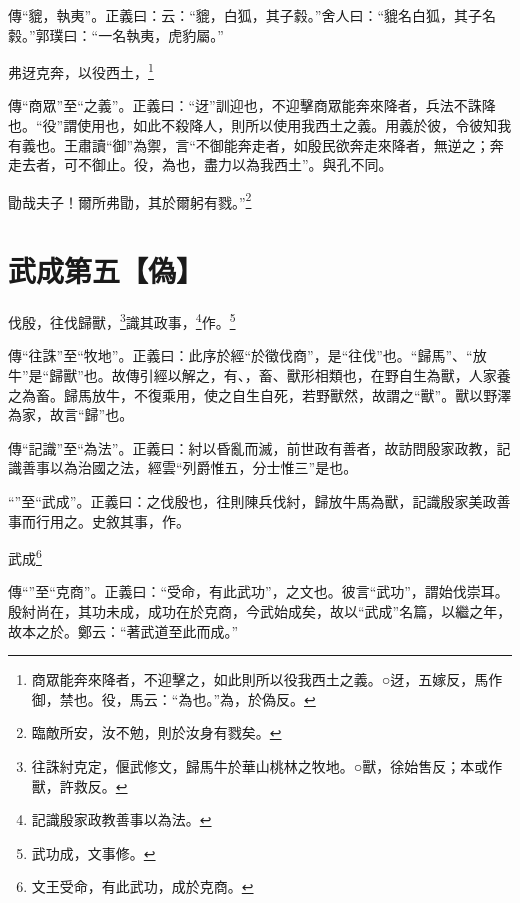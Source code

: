 {\noindent\zhuan{}\fzbyks 傳“貔，執夷”。正義曰：云：“貔，白狐，其子豰。”舍人曰：“貔名白狐，其子名豰。”郭璞曰：“一名執夷，虎豹屬。” \par}

弗迓克奔，以役西土，\footnote{商眾能奔來降者，不迎擊之，如此則所以役我西土之義。○迓，五嫁反，馬作御，禁也。役，馬云：“為也。”為，於偽反。}

{\noindent\zhuan{}\fzbyks 傳“商眾”至“之義”。正義曰：“迓”訓迎也，不迎擊商眾能奔來降者，兵法不誅降也。“役”謂使用也，如此不殺降人，則所以使用我西土之義。用義於彼，令彼知我有義也。王肅讀“御”為禦，言“不御能奔走者，如殷民欲奔走來降者，無逆之；奔走去者，可不御止。役，為也，盡力以為我西土”。與孔不同。 \par}

勖哉夫子！爾所弗勖，其於爾躬有戮。”\footnote{臨敵所安，汝不勉，則於汝身有戮矣。}

\section{武成第五【偽】}


伐殷，往伐歸獸，\footnote{往誅紂克定，偃武修文，歸馬牛於華山桃林之牧地。○獸，徐始售反；本或作獸，許救反。}識其政事，\footnote{記識殷家政教善事以為法。}作。\footnote{武功成，文事修。}


{\noindent\zhuan{}\fzbyks 傳“往誅”至“牧地”。正義曰：此序於經“於徵伐商”，是“往伐”也。“歸馬”、“放牛”是“歸獸”也。故傳引經以解之，有、，畜、獸形相類也，在野自生為獸，人家養之為畜。歸馬放牛，不復乘用，使之自生自死，若野獸然，故謂之“獸”。獸以野澤為家，故言“歸”也。 \par}

{\noindent\zhuan{}\fzbyks 傳“記識”至“為法”。正義曰：紂以昏亂而滅，前世政有善者，故訪問殷家政教，記識善事以為治國之法，經雲“列爵惟五，分士惟三”是也。 \par}

{\noindent\shu{}\fzkt “”至“武成”。正義曰：之伐殷也，往則陳兵伐紂，歸放牛馬為獸，記識殷家美政善事而行用之。史敘其事，作。 \par}

武成\footnote{文王受命，有此武功，成於克商。}

{\noindent\zhuan{}\fzbyks 傳“”至“克商”。正義曰：“受命，有此武功”，之文也。彼言“武功”，謂始伐崇耳。殷紂尚在，其功未成，成功在於克商，今武始成矣，故以“武成”名篇，以繼之年，故本之於。鄭云：“著武道至此而成。” \par}


